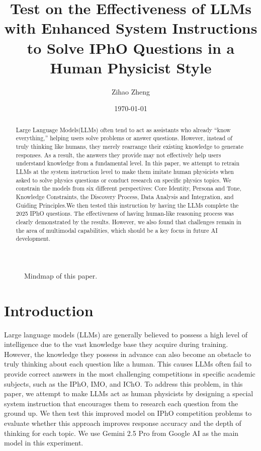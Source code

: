 \documentclass[12pt]{article}
\title{\textbf{Test on the Effectiveness of LLMs with Enhanced System Instructions to Solve IPhO Questions in a Human Physicist Style}}
\author{Zihao Zheng}
\date{\today}
\begin{document}
\maketitle

\begin{abstract}
Large Language Models(LLMs) often tend to act as assistants who already “know everything,” helping users solve problems or answer questions. However, instead of truly thinking like humans, they merely rearrange their existing knowledge to generate responses. As a result, the answers they provide may not effectively help users understand knowledge from a fundamental level. In this paper, we attempt to retrain LLMs at the system instruction level to make them imitate human physicists when asked to solve physics questions or conduct research on specific physics topics. We constrain the models from six different perspectives: Core Identity, Persona and Tone, Knowledge Constraints, the Discovery Process, Data Analysis and Integration, and Guiding Principles.We then tested this instruction by having the LLMs complete the 2025 IPhO questions. The effectiveness of having human-like reasoning process was clearly demonstrated by the results. However, we also found that challenges remain in the area of multimodal capabilities, which should be a key focus in future AI development.
\end{abstract}

\begin{figure}[ht]
  \centering
  \resizebox{0.9\textwidth}{!}{}
  \caption{Mindmap of this paper.}
  \label{fig:mindmap}
\end{figure}

\thispagestyle{githubfooter}
\section{Introduction}

Large language models (LLMs) are generally believed to possess a high level of intelligence due to the vast knowledge base they acquire during training. However, the knowledge they possess in advance can also become an obstacle to truly thinking about each question like a human. This causes LLMs often fail to provide correct answers in the most challenging competitions in specific academic subjects, such as the IPhO, IMO, and IChO. To address this problem, in this paper, we attempt to make LLMs act as human physicists by designing a special system instruction that encourages them to research each question from the ground up. We then test this improved model on IPhO competition problems to evaluate whether this approach improves response accuracy and the depth of thinking for each topic. We use Gemini 2.5 Pro from Google AI as the main model in this experiment.
\end{document}

